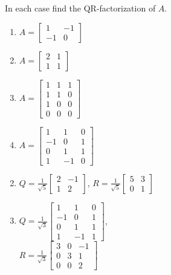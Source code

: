 \documentclass{ximera}
\begin{document}
\begin{problem}\label{prob:findQR}
In each case find the QR-factorization of $A$.

\begin{enumerate}
\item $A = \left[ \begin{array}{rr}
1 & -1 \\
-1 & 0
\end{array}\right]$
\item $A = \left[ \begin{array}{rr}
2 & 1 \\
1 &1
\end{array}\right]$
\item $A = \left[ \begin{array}{rrr}
1 & 1 & 1 \\
1 & 1 & 0 \\
1 & 0 & 0 \\
0 & 0 & 0
\end{array}\right]$
\item $A = \left[ \begin{array}{rrr}
1 & 1 & 0 \\
-1 & 0 & 1 \\
0 & 1 & 1 \\
1 & -1 & 0
\end{array}\right]$
\end{enumerate}
\begin{hint}
\begin{enumerate} 
\setcounter{enumi}{1}
\item  $Q = \frac{1}{\sqrt{5}}\left[ \begin{array}{rr}
2 & -1 \\
1 & 2
\end{array}\right]$,
 $R = \frac{1}{\sqrt{5}}\left[ \begin{array}{rr}
5 & 3 \\
0 & 1
\end{array}\right]$

\setcounter{enumi}{3}
\item  $Q = \frac{1}{\sqrt{3}}\left[ \begin{array}{rrr}
1 & 1 & 0 \\
-1 & 0 & 1 \\
0 & 1 & 1 \\
1 & -1 & 1
\end{array}\right]$, \\
$R = \frac{1}{\sqrt{3}}\left[ \begin{array}{rrr}
3 & 0 & -1 \\
0 & 3 & 1 \\
0 & 0 & 2
\end{array}\right]$

\end{enumerate}
\end{hint}
\end{problem}
\end{document}
